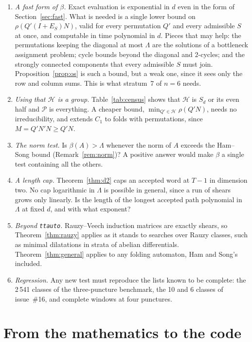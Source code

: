 \documentclass[11pt]{amsart}
\newcommand{\ttauto}{\texttt{ttauto}}
\newcommand{\Lam}{\Lambda}
\newcommand{\Pos}{\mathcal{P}}
\newcommand{\Hgp}{\mathcal{H}}
\theoremstyle{plain}
\theoremstyle{definition}
\begin{document}
\begin{enumerate}
\item \emph{A fast form of $\beta$.}  Exact evaluation is exponential in $d$
  even in the form of Section~\ref{sec:fast}.  What is needed is a single
  lower bound on $\rho(Q'(I+E_S)N)$, valid for every permutation $Q'$ and
  every admissible $S$ at once, and computable in time polynomial in $d$.
  Pieces that may help: the permutations keeping the diagonal at most
  $\Lam$ are the solutions of a bottleneck assignment problem; cycle
  bounds beyond the diagonal and $2$-cycles; and the strongly connected
  components that every admissible $S$ must join.
  Proposition~\ref{prop:os} is such a bound, but a weak one, since it sees
  only the row and column sums.  This is what stratum~7 of $n=6$
  needs.
\item \emph{Using that $\Hgp$ is a group.}  Table~\ref{tab:census} shows
  that $\Hgp$ is $S_d$ or its even half and $\Pos$ is everything.  A cheaper
  bound, $\min_{Q'\in\Hgp}\rho(Q'N)$, needs no irreducibility, and extends
  $C_1$ to folds with permutations, since $M=Q'N'N\ge Q'N$.
\item \emph{The norm test.}  Is $\beta(A)>\Lam$ whenever the norm of $A$
  exceeds the Ham--Song bound (Remark~\ref{rem:norm})?  A positive answer
  would make $\beta$ a single test containing all the others.
\item \emph{A length cap.}  Theorem~\ref{thm:d2} caps an accepted word at
  $T-1$ in dimension two.  No cap logarithmic in $\Lam$ is possible in
  general, since a run of shears grows only linearly.  Is the length of the
  longest accepted path polynomial in $\Lam$ at fixed $d$, and with what
  exponent?
\item \emph{Beyond \ttauto.}  Rauzy--Veech induction matrices are exactly
  shears, so Theorem~\ref{thm:rauzy} applies as it stands to searches over
  Rauzy classes, such as minimal dilatations in strata of abelian
  differentials.  Theorem~\ref{thm:general} applies to any folding
  automaton, Ham and Song's included.
\item \emph{Regression.}  Any new test must reproduce the lists known to be
  complete: the 2\,541 classes of the three-puncture benchmark, the 10 and
  6 classes of issue~\#16, and complete windows at four punctures.
\end{enumerate}

\section{From the mathematics to the code}
\label{sec:code}
\end{document}
